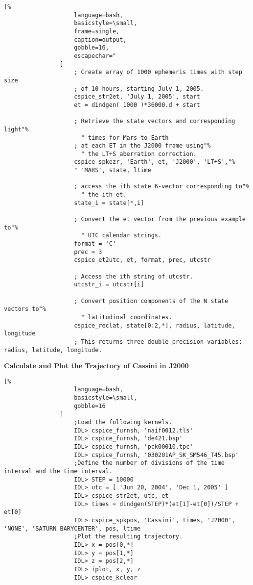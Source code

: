 \documentclass[crop=false,class=book,oneside]{standalone}
\begin{document}
                \begin{lstlisting}[%
                    language=bash,
                    basicstyle=\small,
                    frame=single,
                    caption=output,
                    gobble=16,
                    escapechar="
                ]
                    ; Create array of 1000 ephemeris times with step size
                    ; of 10 hours, starting July 1, 2005.
                    cspice_str2et, 'July 1, 2005', start
                    et = dindgen( 1000 )*36000.d + start
    
                    ; Retrieve the state vectors and corresponding light"%
                      " times for Mars to Earth
                    ; at each ET in the J2000 frame using"%
                      " the LT+S aberration correction.
                    cspice_spkezr, 'Earth', et, 'J2000', 'LT+S',"%
                    " 'MARS', state, ltime
        
                    ; access the ith state 6-vector corresponding to"%
                      " the ith et.
                    state_i = state[*,i]
    
                    ; Convert the et vector from the previous example to"%
                      " UTC calendar strings.
                    format = 'C'
                    prec = 3
                    cspice_et2utc, et, format, prec, utcstr
    
                    ; Access the ith string of utcstr.
                    utcstr_i = utcstr[i]
    
                    ; Convert position components of the N state vectors to"%
                      " latitudinal coordinates.
                    cspice_reclat, state[0:2,*], radius, latitude, longitude
                    ; This returns three double precision variables: radius, latitude, longitude.
                \end{lstlisting}
                \textbf{Calculate and Plot the Trajectory of Cassini in J2000}
                \begin{lstlisting}[%
                    language=bash,
                    basicstyle=\small,
                    gobble=16
                ]
                    ;Load the following kernels.
                    IDL> cspice_furnsh, 'naif0012.tls'
                    IDL> cspice_furnsh, 'de421.bsp'
                    IDL> cspice_furnsh, 'pck00010.tpc'
                    IDL> cspice_furnsh, '030201AP_SK_SM546_T45.bsp' 
                    ;Define the number of divisions of the time interval and the time interval.
                    IDL> STEP = 10000
                    IDL> utc = [ 'Jun 20, 2004', 'Dec 1, 2005' ]
                    IDL> cspice_str2et, utc, et
                    IDL> times = dindgen(STEP)*(et[1]-et[0])/STEP + et[0]
                    IDL> cspice_spkpos, 'Cassini', times, 'J2000', 'NONE', 'SATURN BARYCENTER', pos, ltime
                    ;Plot the resulting trajectory.
                    IDL> x = pos[0,*]
                    IDL> y = pos[1,*]
                    IDL> z = pos[2,*]
                    IDL> iplot, x, y, z
                    IDL> cspice_kclear
                \end{lstlisting}
\end{document}
